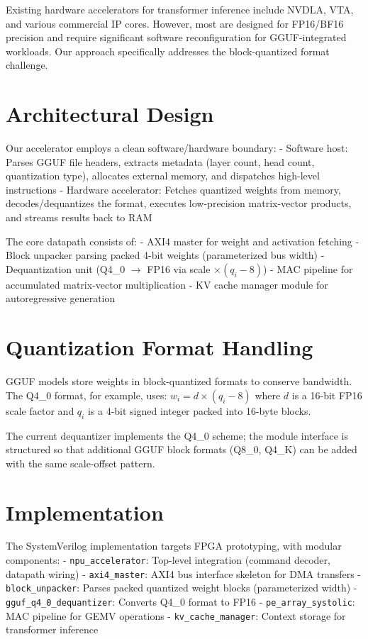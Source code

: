 \documentclass[12pt, conference]{ieeeconf}
\begin{document}
Existing hardware accelerators for transformer inference include NVDLA, VTA, and various commercial IP cores. However, most are designed for FP16/BF16 precision and require significant software reconfiguration for GGUF-integrated workloads. Our approach specifically addresses the block-quantized format challenge.

\section{Architectural Design}

Our accelerator employs a clean software/hardware boundary:
- Software host: Parses GGUF file headers, extracts metadata (layer count, head count, quantization type), allocates external memory, and dispatches high-level instructions
- Hardware accelerator: Fetches quantized weights from memory, decodes/dequantizes the format, executes low-precision matrix-vector products, and streams results back to RAM

The core datapath consists of:
- AXI4 master for weight and activation fetching
- Block unpacker parsing packed 4-bit weights (parameterized bus width)
- Dequantization unit (Q4\_0 $\rightarrow$ FP16 via scale $\times (q_i - 8)$)
- MAC pipeline for accumulated matrix-vector multiplication
- KV cache manager module for autoregressive generation

\section{Quantization Format Handling}

GGUF models store weights in block-quantized formats to conserve bandwidth. The Q4\_0 format, for example, uses:
$w_i = d \times (q_i - 8)$
where $d$ is a 16-bit FP16 scale factor and $q_i$ is a 4-bit signed integer packed into 16-byte blocks.

The current dequantizer implements the Q4\_0 scheme; the module interface is structured so that additional GGUF block formats (Q8\_0, Q4\_K) can be added with the same scale-offset pattern.

\section{Implementation}

The SystemVerilog implementation targets FPGA prototyping, with modular components:
- \texttt{npu\_accelerator}: Top-level integration (command decoder, datapath wiring)
- \texttt{axi4\_master}: AXI4 bus interface skeleton for DMA transfers
- \texttt{block\_unpacker}: Parses packed quantized weight blocks (parameterized width)
- \texttt{gguf\_q4\_0\_dequantizer}: Converts Q4\_0 format to FP16
- \texttt{pe\_array\_systolic}: MAC pipeline for GEMV operations
- \texttt{kv\_cache\_manager}: Context storage for transformer inference
\end{document}
